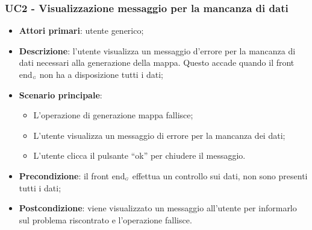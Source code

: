 \subsubsection{UC2 - Visualizzazione messaggio per la mancanza di dati }\label{visualizzazioneMessaggioMancanzaDati} %
\begin{itemize}
	\item \textbf{Attori primari}: utente generico;
	\item \textbf{Descrizione}: l’utente visualizza un messaggio d’errore per la mancanza di dati necessari alla generazione della mappa. Questo accade quando il front end$_{\scaleto{G}{3pt}}$ non ha a disposizione tutti i dati;
	\item \textbf{Scenario principale}: 
	\begin{itemize}
		\item L’operazione di generazione mappa fallisce;
		\item L’utente visualizza un messaggio di errore per la mancanza dei dati;
		\item L’utente clicca il pulsante “ok” per chiudere il messaggio.
	\end{itemize}
	\item \textbf{Precondizione}: il front end$_{\scaleto{G}{3pt}}$ effettua un controllo sui dati, non sono presenti tutti i dati;
	\item \textbf{Postcondizione}: viene visualizzato un messaggio all’utente per informarlo sul problema riscontrato e l’operazione fallisce.
\end{itemize}

